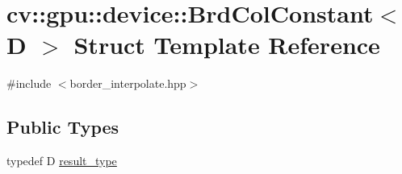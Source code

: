 \hypertarget{structcv_1_1gpu_1_1device_1_1BrdColConstant}{\section{cv\-:\-:gpu\-:\-:device\-:\-:Brd\-Col\-Constant$<$ D $>$ Struct Template Reference}
\label{structcv_1_1gpu_1_1device_1_1BrdColConstant}
}


{\ttfamily \#include $<$border\-\_\-interpolate.\-hpp$>$}

\subsection*{Public Types}
\begin{DoxyCompactItemize}
\item 
typedef D \hyperlink{structcv_1_1gpu_1_1device_1_1BrdColConstant_a6b2a71e09b1e40a68bff05f1c10794dc}{result\-\_\-type}
\end{DoxyCompactItemize}
